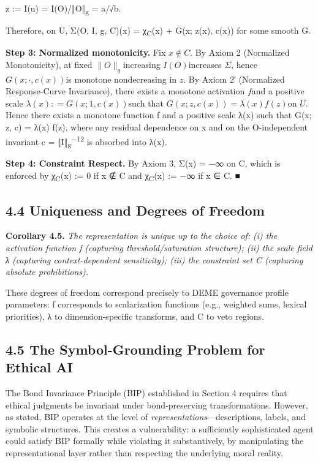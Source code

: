\documentclass[12pt]{article}
\theoremstyle{plain}
\theoremstyle{definition}
\theoremstyle{remark}
\begin{document}
z := I(u) = I(O)/‖O‖\textsubscript{g} = a/√b.

Therefore, on U, Σ(O, I, g, C)(x) = χ\textsubscript{C}(x) + G(x; z(x),
c(x)) for some smooth G.

\textbf{Step 3: Normalized monotonicity.} Fix \(x \notin C\). By Axiom 2
(Normalized Monotonicity), at fixed
\(\parallel O \parallel_{g}\)increasing \(I(O)\)increases \(\Sigma\),
hence \(G(x; \cdot ,c(x))\)is monotone nondecreasing in \(z\). By Axiom
2′ (Normalized Response-Curve Invariance), there exists a monotone
activation \(f\)and a positive scale \(\lambda(x): = G(x;1,c(x))\)such
that \(G(x;z,c(x)) = \lambda(x)f(z)\)on \(U\). Hence there exists a
monotone function f and a positive scale λ(x) such that G(x; z, c) =
λ(x) f(z), where any residual dependence on x and on the O-independent
invariant c = ‖I‖\textsubscript{g}\textsuperscript{−12} is absorbed into
λ(x).

\textbf{Step 4: Constraint Respect.} By Axiom 3, Σ(x) = −∞ on C, which
is enforced by χ\textsubscript{C}(x) := 0 if x ∉ C and
χ\textsubscript{C}(x) := −∞ if x ∈ C. ■

\subsection{4.4 Uniqueness and Degrees of
Freedom}\label{uniqueness-and-degrees-of-freedom}

\textbf{Corollary 4.5.} \emph{The representation is unique up to the
choice of: (i) the activation function f (capturing threshold/saturation
structure); (ii) the scale field λ (capturing context-dependent
sensitivity); (iii) the constraint set C (capturing absolute
prohibitions).}

These degrees of freedom correspond precisely to DEME governance profile
parameters: f corresponds to scalarization functions (e.g., weighted
sums, lexical priorities), λ to dimension-specific transforms, and C to
veto regions.

\subsection{4.5 The Symbol-Grounding Problem for Ethical
AI}\label{the-symbol-grounding-problem-for-ethical-ai}

The Bond Invariance Principle (BIP) established in Section 4 requires
that ethical judgments be invariant under bond-preserving
transformations. However, as stated, BIP operates at the level of
\emph{representations}---descriptions, labels, and symbolic structures.
This creates a vulnerability: a sufficiently sophisticated agent could
satisfy BIP formally while violating it substantively, by manipulating
the representational layer rather than respecting the underlying moral
reality.
\end{document}
